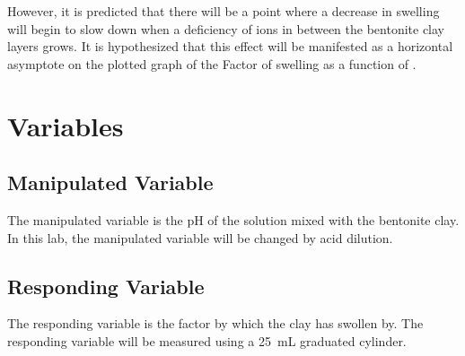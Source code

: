 \documentclass[11pt, letterpaper]{article}
\begin{document}
However, it is predicted that there will be a point where
a decrease in swelling will begin to slow down when a deficiency
of  ions in between the bentonite clay layers grows.
It is hypothesized that this effect will be manifested
as a horizontal asymptote on the plotted graph of the Factor
of swelling as a function of \ce{[H+]}.

\section{Variables}

\begin{paracol}{2}
    \subsection{Manipulated Variable}
    The manipulated variable is the pH of the solution mixed with the
    bentonite clay. In this lab, the manipulated variable will be
    changed by acid dilution.
    \switchcolumn
    \subsection{Responding Variable}
    The responding variable is the factor by which the clay has swollen by.
    The responding variable will be measured using a \SI{25}{mL} graduated cylinder.

\end{paracol}
\end{document}
